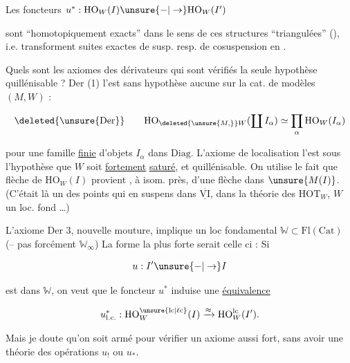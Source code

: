 Les foncteurs $u^*:\mathrm{HO}_W(I)\unsure{-|\to}\mathrm{HO}_W(I')$

sont ``homotopiquement exacts'' dans le sens de ces structures ``triangulées'' (), i.e. transforment suites exactes de susp. resp. de cosuspension en .

Quels sont les axiomes des dérivateurs qui sont vérifiés  la seule hypothèse quillénisable ? $\mathrm{Der}$ (1) l'est sans hypothèse aucune sur la cat. de modèles $(M,W)$ :

\[ \deleted{\unsure{\mathrm{Der}}}\qquad\mathrm{HO}_{\deleted{\unsure{M,}}W}(\coprod I_\alpha)\simeq\prod_\alpha\mathrm{HO}_W(I_\alpha) \]

pour une famille \uline{finie} d'objets $I_\alpha$ dans $\mathrm{Diag}$. L'axiome de localisation  l'est sous l'hypothèse que $W$ soit \uline{fortement} \uline{saturé}, et quillénisable. On utilise le fait que  flèche de $\mathrm{HO}_W(I)$ provient , à isom. près, d'une flèche dans $\unsure{M(I)}$. (C'était là un des points qui  en suspens dans $\overline{\underline{\mathrm{VI}}}$, dans la théorie  des $\mathrm{HOT}_W$, $W$ un loc. fond \ldots)



L'axiome $\mathrm{Der}$ 3, nouvelle mouture, implique un loc fondamental $\mathbb{W}\subset\mathrm{Fl}(\mathrm{Cat})$ (-- pas forcément $\mathbb{W}_\infty$) La forme la plus forte serait celle ci : Si

\[ u:I'\unsure{-|\to}I \]

est dans $\mathbb{W}$, on veut que le foncteur $u^*$ induise une \uline{équivalence}

\[ u^{*}_{\mathrm{l.c.}}:\mathrm{HO}^{\unsure{\mathrm{lc}|\ell\mathrm{c}}}_W(I)\xrightarrow{\approx}\mathrm{HO}^{\mathrm{lc}}_W(I'). \]

Mais je doute qu'on soit armé pour vérifier un axiome aussi fort, sans avoir  une théorie des opérations $u_!$ ou $u_*$.

